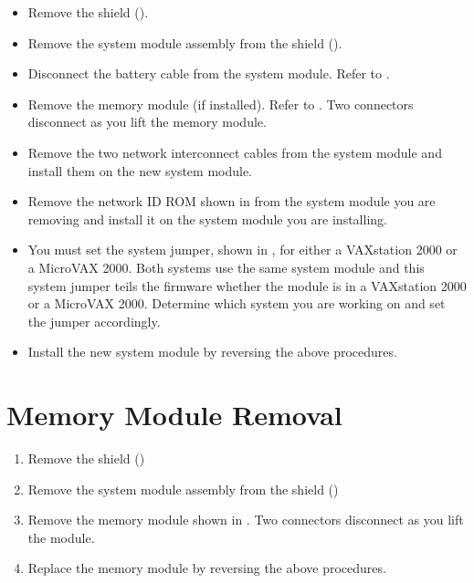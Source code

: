 \begin{itemize}

\item	Remove the shield ().

\item	Remove the system module assembly from the shield ().

\item	Disconnect the battery cable from the system module. Refer to .

\newpage

\item	Remove the memory module (if installed). Refer to . Two
		connectors disconnect as you lift the memory module.

\item	Remove the two network interconnect cables from the system module
		and install them on the new system module.

\newpage

\item	Remove the network ID ROM shown in  from the system
		module you are removing and install it on the system module you are
		installing.
\newpage

\item	You must set the system jumper, shown in , for either a
		VAXstation 2000 or a MicroVAX 2000. Both systems use the same 
		system module and this system jumper teils the firmware whether the 
		module is in a VAXstation 2000 or a MicroVAX 2000. Determine which 
		system you are working on and set the jumper accordingly.

\item	Install the new system module by reversing the above procedures.

\end{itemize}

\newpage

\section{Memory Module Removal}

\begin{enumerate}

\item	Remove the shield ()

\item	Remove the system module assembly from the shield ()

\item	Remove the memory module shown in . Two connectors
		disconnect as you lift the module.


\item	Replace the memory module by reversing the above procedures.

\end{enumerate}
\newpage

